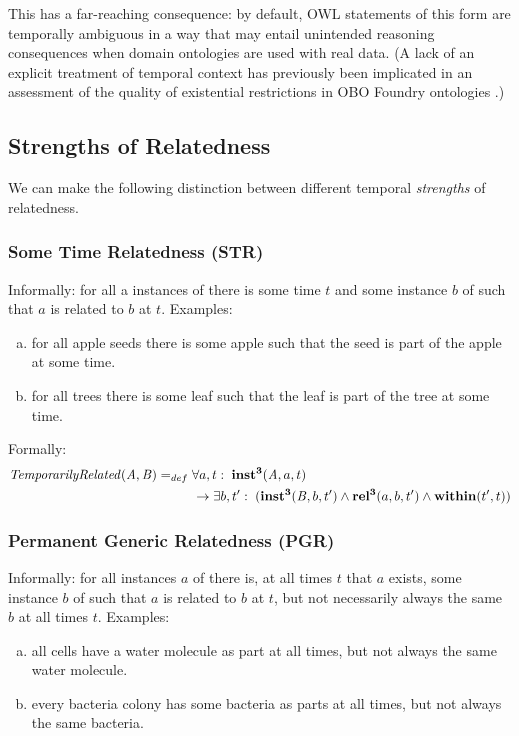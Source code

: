 This has a far-reaching consequence: by default, OWL statements of this form are temporally ambiguous in a way that may entail unintended reasoning consequences when domain ontologies are used with real data. (A lack of an explicit treatment of temporal context has previously been implicated in an assessment of the quality of existential restrictions in OBO Foundry ontologies \cite{boeker2011}.)

\subsection*{Strengths of Relatedness}

We can make the following distinction between different temporal \emph{strengths} of relatedness.

\subsubsection*{Some Time Relatedness (STR)}

Informally: for all a instances of  there is some time $t$ and some instance $b$ of
 such that $a$ is related to $b$ at $t$. Examples:
\begin{enumerate}[(a)]
\item for all apple seeds there is
some apple such that the seed is part of the apple at some time.
\item for all
trees there is some leaf such that the leaf is part of the tree at some time.
\end{enumerate}

Formally:
\begin{equation}
\begin{split}
\mathit{TemporarilyRelated}(\mathit{A},\mathit{B}) =_{def}&\;
\forall a, t:\; \mathrm{\mathbf{inst^3}}(\mathit{A}, a, t) \\
&\ \rightarrow
\exists b, t^\prime:\;(\mathrm{\mathbf{inst^3}}(\mathit{B},b,t^\prime) \wedge
\mathrm{\mathbf{rel^3}}(a,b,t^\prime) \wedge \mathrm{\mathbf{within}}(t^\prime,t))
\end{split}
\label{eq:temporarily:cls}
\end{equation}

\subsubsection*{Permanent Generic Relatedness (PGR)}

Informally: for all instances $a$ of  there is, at all times $t$ that
$a$ exists,
some instance $b$ of  such that $a$ is related to $b$ at $t$, but not necessarily
always the same $b$ at all times $t$. Examples:
\begin{enumerate}[(a)]
\item all cells have a water molecule as
part at all times, but not always the same water molecule.
\item every bacteria colony has some bacteria as parts at all times, but not
always the same bacteria.
\end{enumerate}

